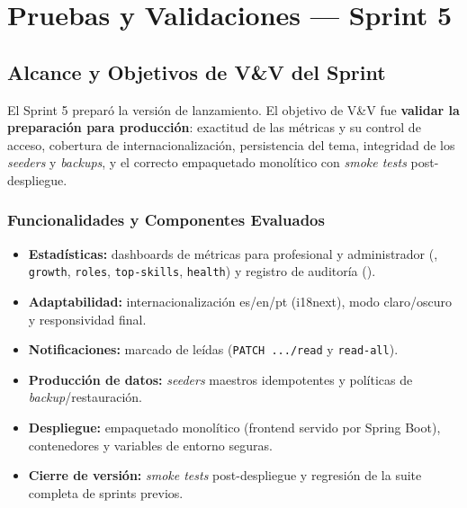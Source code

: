 \chapter{Pruebas y Validaciones — Sprint 5}
\label{ch:sprint5}

\section{Alcance y Objetivos de V\&V del Sprint}
\label{sec:s5-alcance}

El Sprint 5 preparó la versión de lanzamiento. El objetivo de V\&V fue \textbf{validar la
preparación para producción}: exactitud de las métricas y su control de acceso, cobertura
de internacionalización, persistencia del tema, integridad de los \textit{seeders} y
\textit{backups}, y el correcto empaquetado monolítico con \textit{smoke tests}
post-despliegue.

\subsection{Funcionalidades y Componentes Evaluados}
\label{sec:s5-funcionalidades}

\begin{itemize}
    \item \textbf{Estadísticas:} dashboards de métricas para profesional y administrador
    (, \texttt{growth}, \texttt{roles},
    \texttt{top-skills}, \texttt{health}) y registro de auditoría ().
    \item \textbf{Adaptabilidad:} internacionalización es/en/pt (i18next), modo claro/oscuro
    y responsividad final.
    \item \textbf{Notificaciones:} marcado de leídas (\texttt{PATCH .../read} y
    \texttt{read-all}).
    \item \textbf{Producción de datos:} \textit{seeders} maestros idempotentes y políticas
    de \textit{backup}/restauración.
    \item \textbf{Despliegue:} empaquetado monolítico (frontend servido por Spring Boot),
    contenedores y variables de entorno seguras.
    \item \textbf{Cierre de versión:} \textit{smoke tests} post-despliegue y regresión de la
    suite completa de sprints previos.
\end{itemize}

